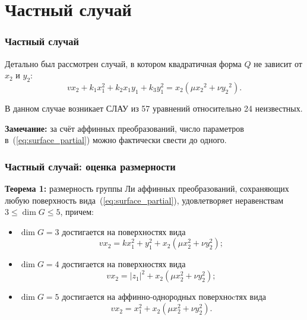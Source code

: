 \documentclass[russian,hyperref={unicode}]{beamer}
\begin{document}
\section{Частный случай}
\frame
{
	\frametitle{Частный случай}
	Детально был рассмотрен случай, в котором квадратичная форма $Q$ не зависит от $x_2$ 
   и $y_2$:
	\begin{equation}\label{eq:surface_partial}
	v x_2 + k_1 x_1^2 + k_2 x_1 y_1 + k_3 y_1^2 = x_2 (\mu {x_2}^2 + \nu {y_2}^2).
	\end{equation}

	В данном случае возникает СЛАУ из 57 уравнений относительно 24 неизвестных.
	
	\textbf{Замечание:}
	за счёт аффинных преобразований, число параметров в~(\ref{eq:surface_partial}) 
	можно фактически свести до одного.
}
\frame
{
	\frametitle{Частный случай: оценка размерности}
	\textbf{Теорема 1:}
	размерность группы Ли аффинных преобразований, сохраняющих любую 
	поверхность вида~(\ref{eq:surface_partial}), удовлетворяет неравенствам 
	$ 3 \le \dim G \le 5$, причем:
	\begin{itemize}
		\item $\dim G = 3$ достигается на поверхностях вида
		\begin{equation}\label{eq:dim3}
			v x_2 = k x_1^2 + y_1^2 + x_2 (\mu x_2^2 + \nu y_2^2);
		\end{equation}
		\item $\dim G = 4$ достигается на поверхностях вида
		\begin{equation}\label{eq:dim4}
			v x_2 = |z_1|^2 + x_2 (\mu x_2^2 + \nu y_2^2);
		\end{equation}
		\item $\dim G = 5$ достигается на аффинно-однородных поверхноcтях вида
		\begin{equation}\label{eq:dim5}
			v x_2 = x_1^2 + x_2 (\mu x_2^2 + \nu y_2^2).
		\end{equation}
	\end{itemize}
}
\frame
\end{document}
